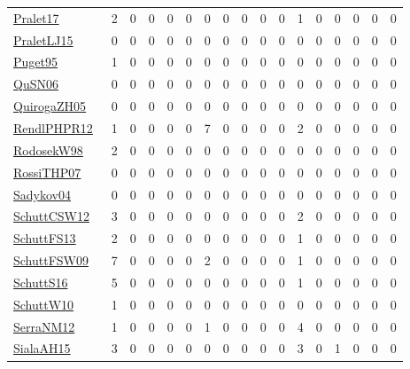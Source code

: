 {\begin{longtable}{l*{16}{r}}
\href{papers/Pralet17.pdf}{Pralet17}~\cite{Pralet17} & 2 & 0 & 0 & 0 & 0 & 0 & 0 & 0 & 0 & 0 & 1 & 0 & 0 & 0 & 0 & 0\\
\href{papers/PraletLJ15.pdf}{PraletLJ15}~\cite{PraletLJ15} & 0 & 0 & 0 & 0 & 0 & 0 & 0 & 0 & 0 & 0 & 0 & 0 & 0 & 0 & 0 & 0\\
\href{papers/Puget95.pdf}{Puget95}~\cite{Puget95} & 1 & 0 & 0 & 0 & 0 & 0 & 0 & 0 & 0 & 0 & 0 & 0 & 0 & 0 & 0 & 0\\
\href{papers/QuSN06.pdf}{QuSN06}~\cite{QuSN06} & 0 & 0 & 0 & 0 & 0 & 0 & 0 & 0 & 0 & 0 & 0 & 0 & 0 & 0 & 0 & 0\\
\href{papers/QuirogaZH05.pdf}{QuirogaZH05}~\cite{QuirogaZH05} & 0 & 0 & 0 & 0 & 0 & 0 & 0 & 0 & 0 & 0 & 0 & 0 & 0 & 0 & 0 & 0\\
\href{papers/RendlPHPR12.pdf}{RendlPHPR12}~\cite{RendlPHPR12} & 1 & 0 & 0 & 0 & 0 & 7 & 0 & 0 & 0 & 0 & 2 & 0 & 0 & 0 & 0 & 0\\
\href{papers/RodosekW98.pdf}{RodosekW98}~\cite{RodosekW98} & 2 & 0 & 0 & 0 & 0 & 0 & 0 & 0 & 0 & 0 & 0 & 0 & 0 & 0 & 0 & 0\\
\href{papers/RossiTHP07.pdf}{RossiTHP07}~\cite{RossiTHP07} & 0 & 0 & 0 & 0 & 0 & 0 & 0 & 0 & 0 & 0 & 0 & 0 & 0 & 0 & 0 & 0\\
\href{papers/Sadykov04.pdf}{Sadykov04}~\cite{Sadykov04} & 0 & 0 & 0 & 0 & 0 & 0 & 0 & 0 & 0 & 0 & 0 & 0 & 0 & 0 & 0 & 0\\
\href{papers/SchuttCSW12.pdf}{SchuttCSW12}~\cite{SchuttCSW12} & 3 & 0 & 0 & 0 & 0 & 0 & 0 & 0 & 0 & 0 & 2 & 0 & 0 & 0 & 0 & 0\\
\href{papers/SchuttFS13.pdf}{SchuttFS13}~\cite{SchuttFS13} & 2 & 0 & 0 & 0 & 0 & 0 & 0 & 0 & 0 & 0 & 1 & 0 & 0 & 0 & 0 & 0\\
\href{papers/SchuttFSW09.pdf}{SchuttFSW09}~\cite{SchuttFSW09} & 7 & 0 & 0 & 0 & 0 & 2 & 0 & 0 & 0 & 0 & 1 & 0 & 0 & 0 & 0 & 0\\
\href{papers/SchuttS16.pdf}{SchuttS16}~\cite{SchuttS16} & 5 & 0 & 0 & 0 & 0 & 0 & 0 & 0 & 0 & 0 & 1 & 0 & 0 & 0 & 0 & 0\\
\href{papers/SchuttW10.pdf}{SchuttW10}~\cite{SchuttW10} & 1 & 0 & 0 & 0 & 0 & 0 & 0 & 0 & 0 & 0 & 0 & 0 & 0 & 0 & 0 & 0\\
\href{papers/SerraNM12.pdf}{SerraNM12}~\cite{SerraNM12} & 1 & 0 & 0 & 0 & 0 & 1 & 0 & 0 & 0 & 0 & 4 & 0 & 0 & 0 & 0 & 0\\
\href{papers/SialaAH15.pdf}{SialaAH15}~\cite{SialaAH15} & 3 & 0 & 0 & 0 & 0 & 0 & 0 & 0 & 0 & 0 & 3 & 0 & 1 & 0 & 0 & 0\\

\end{longtable}}
